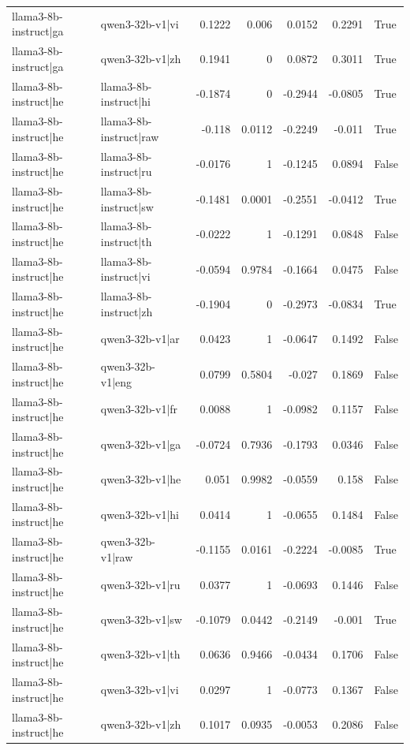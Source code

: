 \begin{table}
\begin{tabular}{l l r r r r l}
llama3-8b-instruct|ga & qwen3-32b-v1|vi & 0.1222 & 0.006 & 0.0152 & 0.2291 & True \\
llama3-8b-instruct|ga & qwen3-32b-v1|zh & 0.1941 & 0 & 0.0872 & 0.3011 & True \\
llama3-8b-instruct|he & llama3-8b-instruct|hi & -0.1874 & 0 & -0.2944 & -0.0805 & True \\
llama3-8b-instruct|he & llama3-8b-instruct|raw & -0.118 & 0.0112 & -0.2249 & -0.011 & True \\
llama3-8b-instruct|he & llama3-8b-instruct|ru & -0.0176 & 1 & -0.1245 & 0.0894 & False \\
llama3-8b-instruct|he & llama3-8b-instruct|sw & -0.1481 & 0.0001 & -0.2551 & -0.0412 & True \\
llama3-8b-instruct|he & llama3-8b-instruct|th & -0.0222 & 1 & -0.1291 & 0.0848 & False \\
llama3-8b-instruct|he & llama3-8b-instruct|vi & -0.0594 & 0.9784 & -0.1664 & 0.0475 & False \\
llama3-8b-instruct|he & llama3-8b-instruct|zh & -0.1904 & 0 & -0.2973 & -0.0834 & True \\
llama3-8b-instruct|he & qwen3-32b-v1|ar & 0.0423 & 1 & -0.0647 & 0.1492 & False \\
llama3-8b-instruct|he & qwen3-32b-v1|eng & 0.0799 & 0.5804 & -0.027 & 0.1869 & False \\
llama3-8b-instruct|he & qwen3-32b-v1|fr & 0.0088 & 1 & -0.0982 & 0.1157 & False \\
llama3-8b-instruct|he & qwen3-32b-v1|ga & -0.0724 & 0.7936 & -0.1793 & 0.0346 & False \\
llama3-8b-instruct|he & qwen3-32b-v1|he & 0.051 & 0.9982 & -0.0559 & 0.158 & False \\
llama3-8b-instruct|he & qwen3-32b-v1|hi & 0.0414 & 1 & -0.0655 & 0.1484 & False \\
llama3-8b-instruct|he & qwen3-32b-v1|raw & -0.1155 & 0.0161 & -0.2224 & -0.0085 & True \\
llama3-8b-instruct|he & qwen3-32b-v1|ru & 0.0377 & 1 & -0.0693 & 0.1446 & False \\
llama3-8b-instruct|he & qwen3-32b-v1|sw & -0.1079 & 0.0442 & -0.2149 & -0.001 & True \\
llama3-8b-instruct|he & qwen3-32b-v1|th & 0.0636 & 0.9466 & -0.0434 & 0.1706 & False \\
llama3-8b-instruct|he & qwen3-32b-v1|vi & 0.0297 & 1 & -0.0773 & 0.1367 & False \\
llama3-8b-instruct|he & qwen3-32b-v1|zh & 0.1017 & 0.0935 & -0.0053 & 0.2086 & False \\

\end{tabular}
\end{table}
